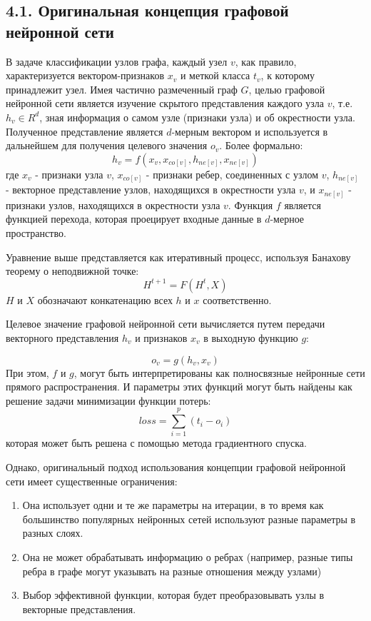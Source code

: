 \subsection{4.1. Оригинальная концепция графовой нейронной сети}

В задаче классификации узлов графа, каждый узел $v$, как правило, характеризуется вектором-признаков $x_v$ и меткой класса $t_v$, к которому принадлежит узел. Имея частично размеченный граф $G$,
целью графовой нейронной сети является изучение скрытого представления каждого узла $v$, т.е. $h_v \in R^d$, зная информация о самом узле (признаки узла) и об окрестности узла. Полученное представление является $d$-мерным вектором и используется в дальнейшем для получения целевого значения $o_v$.  Более формально:
$$
h_v = f(x_v, x_{co[v]}, h_{ne[v]}, x_{ne[v]}) 
$$
где $x_v$ - признаки узла $v$, $x_{co[v]}$ - признаки ребер, соединенных с узлом $v$, $h_{ne[v]}$ - векторное представление узлов, находящихся в окрестности узла $v$, и $x_{ne[v]}$ - признаки узлов, находящихся в окрестности узла $v$.  Функция $f$ является функцией перехода, которая проецирует входные данные в $d$-мерное пространство. 

Уравнение выше представляется как итеративный процесс, используя Банахову теорему о неподвижной точке:
$$
H^{t+1} = F(H^t, X)
$$
$H$ и $X$ обозначают конкатенацию всех $h$ и $x$ соответственно.

Целевое значение графовой нейронной сети вычисляется путем передачи векторного представления $h_v$ и признаков $x_v$ в выходную функцию $g$:

$$
o_v = g(h_v, x_v)
$$
При этом, $f$ и $g$, могут быть интерпретированы как полносвязные нейронные сети прямого распространения. И параметры этих функций могут быть найдены как решение задачи минимизации функции потерь:
$$
	loss = \sum_{i=1}^p (t_i - o_i)
$$
которая может быть решена с помощью метода градиентного спуска.

Однако, оригинальный подход использования концепции графовой нейронной сети имеет существенные ограничения:
\begin{enumerate}
\item Она использует одни и те же параметры на итерации, в то время как большинство популярных нейронных сетей используют разные параметры в разных слоях.
\item Она не может обрабатывать информацию о ребрах (например, разные типы ребра в графе могут указывать на разные отношения между узлами)
\item Выбор эффективной функции, которая будет преобразовывать узлы в векторные представления.
\end{enumerate}

